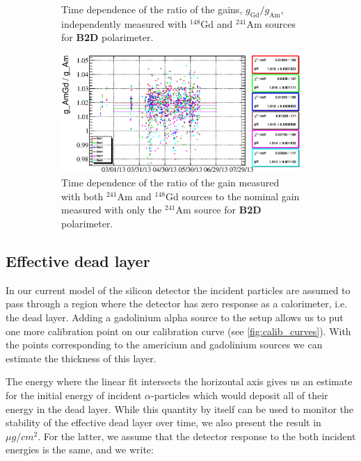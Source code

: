 \documentclass[a4paper,12pt]{article}
\newcommand\americium{${}^{241}$Am}
\newcommand\gadolinium{${}^{148}$Gd}
\begin{document}
\begin{figure}
\begin{subfigure}[t]{0.49\textwidth}
\caption{Time dependence of the ratio of the gains, $g_\text{Gd}/g_\text{Am}$,
independently measured with \gadolinium{} and \americium{} sources for
\textbf{B2D} polarimeter.}
\end{subfigure}
%
\hfill
%
\begin{subfigure}[t]{0.49\textwidth}
\includegraphics[width=\textwidth]{gfx/run13_alpha_study_novoltagevariation/B2D/c_chAmGdGain_over_AmGain_by_day_B2D.eps}
\caption{Time dependence of the ratio of the gain measured with both \americium{} and
\gadolinium{} sources to the nominal gain measured with only the \americium{}
source for \textbf{B2D} polarimeter.}
\end{subfigure}
\caption{\gainrealationslabel{}}
\label{fig:gain_relations}
\end{figure}


\subsection{Effective dead layer}

In our current model of the silicon detector the incident particles are assumed
to pass through a region where the detector has zero response as a calorimeter,
i.e. the dead layer. Adding a gadolinium alpha source to the setup allows us to
put one more calibration point on our calibration curve (see
\cref{fig:calib_curves}). With the points corresponding to the americium
and gadolinium sources we can estimate the thickness of this layer.

The energy where the linear fit intersects the horizontal axis gives us an
estimate for the initial energy of incident $\alpha$-particles which would
deposit all of their energy in the dead layer. While this quantity by itself
can be used to monitor the stability of the effective dead layer over time, we also
present the result in $\mu g/cm^2$. For the latter, we assume that the detector
response to the both incident energies is the same, and we write:
\end{document}
